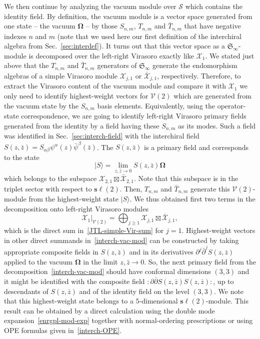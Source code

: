 \documentclass[11pt]{article}
\newcommand{\strt}{T}
\newcommand{\bstrt}{\bar{\strt}}
\newcommand{\vac}{\boldsymbol{\Omega}}
\newcommand{\VirN}{\boldsymbol{\mathcal{V}}}
\newcommand{\interLie}{\mathfrak{S}}
\newcommand{\interchalg}{\mathcal{S}}
\newcommand{\interinfin}{\interLie_{\infty}}
\newcommand{\interM}[1]{\mathscr{X}_{#1}}
\newcommand{\nSU}{\boldsymbol{s\ell}}
\newcommand{\bz}{\bar{z}}
\newcommand{\der}{\partial}
\newcommand{\enrg}{S}
\newcommand{\VX}{\mathcal{X}}
\newcommand{\nord}[1]{\boldsymbol{\colon}\!\!{#1}\boldsymbol{\colon}\!\!}
\theoremstyle{definition}
\begin{document}
\medskip



We then continue by analyzing the vacuum module  over $\interchalg$ which  contains the identity field. By definition, the vacuum module is a vector space generated from one state -- the vacuum $\vac$ -- by those  $\enrg_{n,m}$, $\strt_{n,m}$ and $\bstrt_{n,m}$  that have  negative indexes $n$ and $m$ (note that we used here our first definition of the interchiral algebra from Sec.~\ref{sec:interdef}).
It turns out that this vector space as a $\interinfin$-module is decomposed over the left-right Virasoro exactly like $\interM{1}$. We stated just above that the  $\strt_{n,m}$ and $\bstrt_{n,m}$ generators  of $\interinfin$ generate the endomorphism algebras of a simple Virasoro module $\VX_{j,1}$ or $\bar{\VX}_{j,1}$, respectively.
Therefore,
to extract the Virasoro content of the vacuum module and compare it with $\interM{1}$ we only need to identify highest-weight vectors for $\VirN(2)$ which are generated from the vacuum state by  the $\enrg_{n,m}$ basis elements. Equivalently, using the operator-state  correspondence, we are going to identify left-right Virasoro primary fields  generated from the identity   by a field having these  $\enrg_{n,m}$ as its modes. Such a field was identified in Sec.~\ref{sec:interch-field} with
the interchiral field $\enrg(z,\bz)=S_{\alpha\beta}\psi^{\alpha}(z)\bar{\psi}^{\beta}(\bz)$.
The  $\enrg(z,\bz)$  is a primary field and corresponds to the state
\begin{equation*}
|S\rangle = \lim_{z,\bz\to0}\enrg(z,\bz)\vac
\end{equation*}
which belongs to the subspace $\VX_{2,1}\boxtimes\bar{\VX}_{2,1}$.  Note that this subspace is in the triplet sector with respect to $\nSU(2)$. Then,
$\strt_{n,m}$ and  $\bstrt_{n,m}$  generate this $\VirN(2)$-module from the highest-weight state $|S\rangle$. We thus obtained first two terms in the   decomposition onto  left-right Virasoro modules
\begin{equation}\label{interch-vac-mod}
\interM{1}|_{\VirN(2)}  =  \bigoplus_{j\geq1} \VX_{j,1}\boxtimes\bar{\VX}_{j,1},
\end{equation}
which is the direct sum in~\eqref{JTL-simple-Vir-sum} for $j=1$.
Highest-weight vectors in other direct summands in~\eqref{interch-vac-mod} can be constructed by taking appropriate composite fields in $\enrg(z,\bz)$ and in its derivatives $\der^j\bar{\der}^j\enrg(z,\bz)$ applied to the vacuum $\vac$ in the limit $z,\bz\to0$. So, the next primary field from the decomposition~\eqref{interch-vac-mod} should have conformal dimensions $(3,3)$ and it might be identified with the composite field  $\nord{\der\bar{\der}\enrg(z,\bz)\enrg(z,\bz)}$, up to descendants of $\enrg(z,\bz)$ and of the identity field on the level $(3,3)$. We note that this highest-weight  state belongs to a $5$-dimensional $\nSU(2)$-module.  This result can be obtained by a direct calculation using the double mode expansion~\eqref{enrgpl-mod-exp} together with normal-ordering prescriptions or using OPE formulas given in~\eqref{interch-OPE}.
\end{document}
